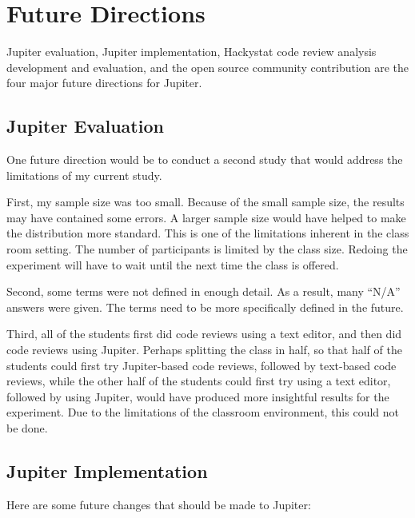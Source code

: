 \section{Future Directions}
\label{sec:future-directions}

Jupiter evaluation, Jupiter implementation, Hackystat code review analysis development and evaluation, and the open source community contribution are the four major future directions for Jupiter.

\subsection{Jupiter Evaluation}
\label{subsec:jupiter-evaluation}

One future direction would be to conduct a second study that would address the limitations of my current study.

First, my sample size was too small. Because of the small sample size, the results may have contained some errors. A larger sample size would have helped to make the distribution more standard. This is one of the limitations inherent in the class room setting. The number of participants is limited by the class size. Redoing the experiment will have to wait until the next time the class is offered.

Second, some terms were not defined in enough detail. As a result, many ``N/A'' answers were given. The terms need to be more specifically defined in the future.

Third, all of the students first did code reviews using a text editor, and then did code reviews using Jupiter. Perhaps splitting the class in half, so that half of the students could first try Jupiter-based code reviews, followed by text-based code reviews, while the other half of the students could first try using a text editor, followed by using Jupiter, would have produced more insightful results for the experiment. Due to the limitations of the classroom environment, this could not be done.

\subsection{Jupiter Implementation}
\label{subsec:jupiter-implementation}

Here are some future changes that should be made to Jupiter:

